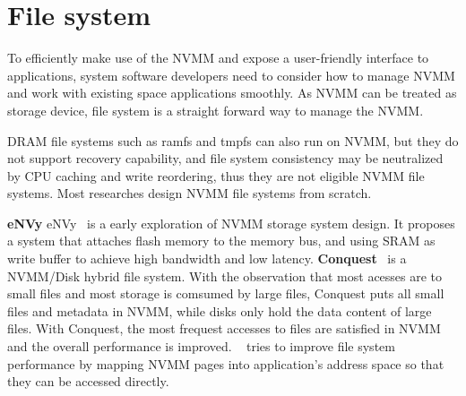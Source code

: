 \section{File system} 
\label{sec:fs}

To efficiently make use of the NVMM and expose a user-friendly
interface to applications, system software developers need to consider
how to manage NVMM and work with existing space applications smoothly.
As NVMM can be treated as storage device, file system is a straight forward
way to manage the NVMM.

DRAM file systems such as ramfs and tmpfs can also run on NVMM, but they
do not support recovery capability, and file system consistency may be 
neutralized by
CPU caching and write reordering, thus they are not eligible NVMM file systems.
Most researches design NVMM file systems from scratch. 

\textbf{eNVy} eNVy~\cite{eNVy} is a early exploration of NVMM storage system
design. It proposes a system that attaches flash memory to the memory
bus, and using SRAM as write buffer to achieve high bandwidth and low latency.
\textbf{Conquest}~\cite{conquest} is a NVMM/Disk hybrid file system.
With the observation that most acesses are to small files and most storage is
comsumed by large files, Conquest puts all small files and metadata in NVMM,
while disks only hold the data content of large files. With Conquest, the most
frequest accesses to files are satisfied in NVMM and the overall performance is
improved. ~\cite{mmfs} tries to improve file system performance by mapping
NVMM pages into application's address space so that they can be accessed
directly. 


